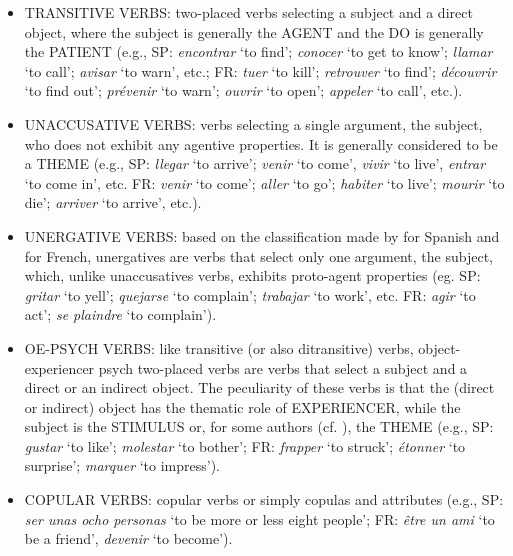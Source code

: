 \begin{itemize}
    \item {\selectfont TRANSITIVE VERBS}: two-placed verbs selecting a subject and a direct object, where the subject is generally the {\selectfont AGENT} and the DO is generally the {\selectfont PATIENT} (e.g., SP: \textit{encontrar} `to find'; \textit{conocer} `to get to know'; \textit{llamar} `to call'; \textit{avisar} `to warn', etc.; FR: \textit{tuer} `to kill'; \textit{retrouver} `to find'; \textit{découvrir} `to find out'; \textit{prévenir} `to warn'; \textit{ouvrir} `to open'; \textit{appeler} `to call', etc.).
    \item {\selectfont UNACCUSATIVE VERBS}: verbs selecting a single argument, the subject, who does not exhibit any agentive properties. It is generally considered to be a {\selectfont THEME} (e.g., SP: \textit{llegar} `to arrive'; \textit{venir} `to come', \textit{vivir} `to live', \textit{entrar} `to come in', etc. FR: \textit{venir} `to come'; \textit{aller} `to go'; \textit{habiter} `to live'; \textit{mourir} `to die'; \textit{arriver} `to arrive', etc.).
    \item {\selectfont UNERGATIVE VERBS}: based on the classification made by \textcite{mendikoetxea1999construcciones} for Spanish and \textcite{legendre1989unaccusativity} for French, unergatives are verbs that select only one argument, the subject, which, unlike unaccusatives verbs, exhibits proto-agent properties (eg. SP: \textit{gritar} `to yell'; \textit{quejarse} `to complain'; \textit{trabajar} `to work', etc. FR: \textit{agir} `to act'; \textit{se plaindre} `to complain').
    \item {\selectfont OE-PSYCH VERBS}: like transitive (or also ditransitive) verbs, object-experiencer psych two-placed verbs are verbs that select a subject and a direct or an indirect object. The peculiarity of these verbs is that the (direct or indirect) object has the thematic role of {\selectfont EXPERIENCER}, while the subject is the {\selectfont STIMULUS} or, for some authors (cf. \cite{gutierrez2013structural}), the {\selectfont THEME} (e.g., SP: \textit{gustar} `to like'; \textit{molestar} `to bother'; FR: \textit{frapper} `to struck'; \textit{étonner} `to surprise'; \textit{marquer} `to impress').
    \item {\selectfont COPULAR VERBS}: copular verbs or simply copulas and attributes (e.g., SP: \textit{ser unas ocho personas} `to be more or less eight people'; FR: \textit{être un ami} `to be a friend', \textit{devenir} `to become').
\end{itemize}


